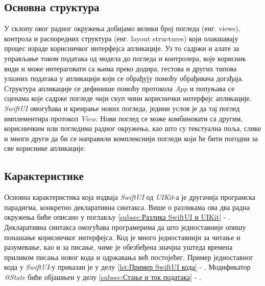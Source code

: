 \documentclass[12pt,oneside]{memoir}
\begin{document}
\subsection{Основна структура}

\indent У склопу овог радног окружења добијамо велики број погледа (енг. views), контрола и распоредних структура (енг. layout structures) који олакшавају процес израде корисничког интерфејса апликације. Уз то садржи и алате за управљање током података од модела до погледа и контролера, које корисник види и може интераговати са њима преко додира, гестова и других типова улазних података у апликацији који се обрађују помоћу обрађивача догађаја. 
\\
\indent Структура апликације се дефинише помоћу протокола \textit{App} и попуњава се сценама које садрже погледе чији скуп чини кориснички интерфејс апликације. \textit{SwiftUI} омогућава и креирање нових погледа, једини услов је да тај поглед имплементира протокол \textit{View}. Нови поглед се може комбиновати са другим, корисничким или погледима радног окружења, као што су текстуална поља, слике и многи други да би се направили комплекснији погледи који ће бити погодни за све кориснике апликације.

\subsection{Карактеристике}

\indent Основна карактеристика која издваја \textit{SwiftUI} од \textit{UIKit}-а је другачија програмска парадигма, конкретно декларативна синтакса. Више о разликама ова два радна окружења биће описано у поглављу \ref{subsec:Разлика SwiftUI и UIKit} - . 
\\
\indent Декларативна синтакса омогућава програмерима да што једноставније опишу понашање корисничког интерфејса. Код је много једноставнији за читање и разумевање, као и за писање, чиме је обезбеђена значјна уштеда времена приликом писања новог кода и одржавања већ постојећег. Пример једноставног кода у \textit{SwiftUI}-у приказан је у делу \ref{lst:Пример SwiftUI кода} - . Модификатор \textit{@State} биће објашњен у делу \ref{subsec:Стање и ток података} - .
\end{document}
